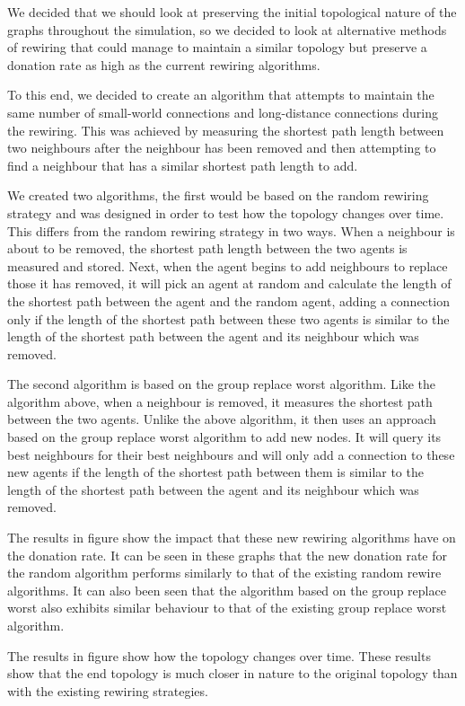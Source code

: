 We decided that we should look at preserving the initial topological nature of the graphs throughout the simulation, so we decided to look at alternative methods of rewiring that could manage to maintain a similar topology but preserve a donation rate as high as the current rewiring algorithms.

To this end, we decided to create an algorithm that attempts to maintain the same number of small-world connections and long-distance connections during the rewiring. This was achieved by measuring the shortest path length between two neighbours after the neighbour has been removed and then attempting to find a neighbour that has a similar shortest path length to add.

We created two algorithms, the first would be based on the random rewiring strategy and was designed in order to test how the topology changes over time. This differs from the random rewiring strategy in two ways. When a neighbour is about to be removed, the shortest path length between the two agents is measured and stored. Next, when the agent begins to add neighbours to replace those it has removed, it will pick an agent at random and calculate the length of the shortest path between the agent and the random agent, adding a connection only if the length of the shortest path between these two agents is similar to the length of the shortest path between the agent and its neighbour which was removed.

The second algorithm is based on the group replace worst algorithm. Like the algorithm above, when a neighbour is removed, it measures the shortest path between the two agents. Unlike the above algorithm, it then uses an approach based on the group replace worst algorithm to add new nodes. It will query its best neighbours for their best neighbours and will only add a connection to these new agents if the length of the shortest path between them is similar to the length of the shortest path between the agent and its neighbour which was removed.

The results in figure show the impact that these new rewiring algorithms have on the donation rate. It can be seen in these graphs that the new donation rate for the random algorithm performs similarly to that of the existing random rewire algorithms. It can also been seen that the algorithm based on the group replace worst also exhibits similar behaviour to that of the existing group replace worst algorithm.

The results in figure show how the topology changes over time. These results show that the end topology is much closer in nature to the original topology than with the existing rewiring strategies.